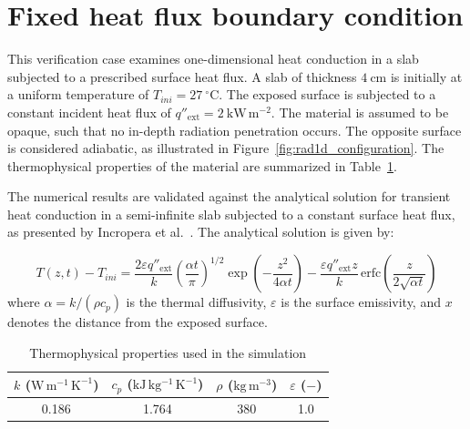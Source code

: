 \documentclass[12pt]{article}
\begin{document}
\fi

\section{Fixed heat flux boundary condition}
\label{case:rad_1d}


This verification case examines one-dimensional heat conduction in a slab subjected to a prescribed surface heat flux. A slab of thickness $4~\mathrm{cm}$ is initially at a uniform temperature of $T_{ini} = 27~^\circ\mathrm{C}$. The exposed surface is subjected to a constant incident heat flux of $q''_{\mathrm{ext}} = 2~\mathrm{kW\,m^{-2}}$. The material is assumed to be opaque, such that no in-depth radiation penetration occurs. The opposite surface is considered adiabatic, as illustrated in Figure~\ref{fig:rad1d_configuration}. The thermophysical properties of the material are summarized in Table~\ref{tab:phys_props_rad}.

The numerical results are validated against the analytical solution for transient heat conduction in a semi-infinite slab subjected to a constant surface heat flux, as presented by Incropera et al.~\cite{incropera_fundamentals_2007}. The analytical solution is given by:

\begin{equation}
T(z,t) - T_{ini} =
\frac{2 \varepsilon q''_{\mathrm{ext}}}{k}
\left( \frac{\alpha t}{\pi} \right)^{1/2}
\exp\left( -\frac{z^2}{4 \alpha t} \right)
-
\frac{\varepsilon q''_{\mathrm{ext}} z}{k}
\, \mathrm{erfc}\!\left( \frac{z}{2\sqrt{\alpha t}} \right)
\label{eq:T_xt}
\end{equation}
where $\alpha = k / (\rho c_p)$ is the thermal diffusivity, $\varepsilon$ is the surface emissivity, and $x$ denotes the distance from the exposed surface.


\begin{table}[H]
\centering
\caption{Thermophysical properties used in the simulation}
\label{tab:phys_props_rad}
\renewcommand{\arraystretch}{1.3}
\begin{tabular}{c c c c}
\hline
$k$ ($\mathrm{W\,m^{-1}\,K^{-1}}$) &
$c_p$ ($\mathrm{kJ\,kg^{-1}\,K^{-1}}$) &
$\rho$ ($\mathrm{kg\,m^{-3}}$) &
$\varepsilon$ ($-$) \\
\hline
0.186 & 1.764 & 380 & 1.0 \\
\hline
\end{tabular}
\end{table}
\end{document}
